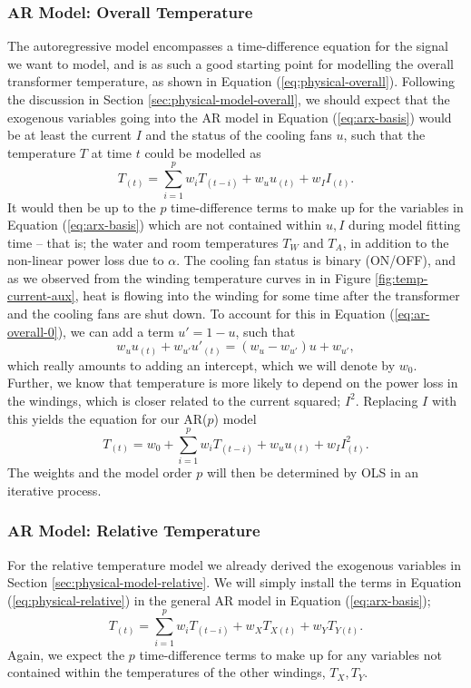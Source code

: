 \documentclass[]{article}
\begin{document}
\subsubsection{AR Model: Overall Temperature} \label{sec:ar-model-overall}
The autoregressive model encompasses a time-difference equation for the signal we want to model, and is as such a good starting point for modelling the overall transformer temperature, as shown in Equation (\ref{eq:physical-overall}). Following the discussion in Section \ref{sec:physical-model-overall}, we should expect that the exogenous variables going into the AR model in Equation (\ref{eq:arx-basis}) would be at least the current $I$ and the status of the cooling fans $u$, such that the temperature $T$ at time $t$ could be modelled as
\begin{equation} \label{eq:ar-overall-0}
	T_{(t)} = \sum_{i=1}^{p} w_i T_{(t-i)} + w_u u_{(t)} + w_{I} I_{(t)}.
\end{equation}
It would then be up to the $p$ time-difference terms to make up for the variables in Equation (\ref{eq:arx-basis}) which are not contained within $u,I$ during model fitting time -- that is; the water and room temperatures $T_W$ and $T_A$, in addition to the non-linear power loss due to $\alpha$. The cooling fan status is binary (ON/OFF), and as we observed from the winding temperature curves in in Figure \ref{fig:temp-current-aux}, heat is flowing into the winding for some time after the transformer and the cooling fans are shut down. To account for this in Equation (\ref{eq:ar-overall-0}), we can add a term $u' = 1 - u$, such that
\begin{equation}
	w_u u_{(t)} + w_{u'} u'_{(t)} = (w_u - w_{u'})u + w_{u'},
\end{equation}
which really amounts to adding an intercept, which we will denote by $w_0$. Further, we know that temperature is more likely to depend on the power loss in the windings, which is closer related to the current squared; $I^2$. Replacing $I$ with this yields the equation for our AR($p$) model
\begin{equation} \label{eq:ar-overall-1}
	T_{(t)} = w_0 + \sum_{i=1}^{p} w_i T_{(t-i)} + w_u u_{(t)} + w_{I} I^2_{(t)}.
\end{equation}
The weights and the model order $p$ will then be determined by OLS in an iterative process.

\subsubsection{AR Model: Relative Temperature} \label{sec:ar-model-relative}
For the relative temperature model we already derived the exogenous variables in Section \ref{sec:physical-model-relative}. We will simply install the terms in Equation (\ref{eq:physical-relative}) in the general AR model in Equation (\ref{eq:arx-basis});
\begin{equation} \label{eq:ar-relative}
	T_{(t)} = \sum_{i=1}^{p} w_i T_{(t-i)} + w_X T_{X(t)} + w_Y T_{Y(t)}.
\end{equation}
Again, we expect the $p$ time-difference terms to make up for any variables not contained within the temperatures of the other windings, $T_X, T_Y$.
\end{document}
